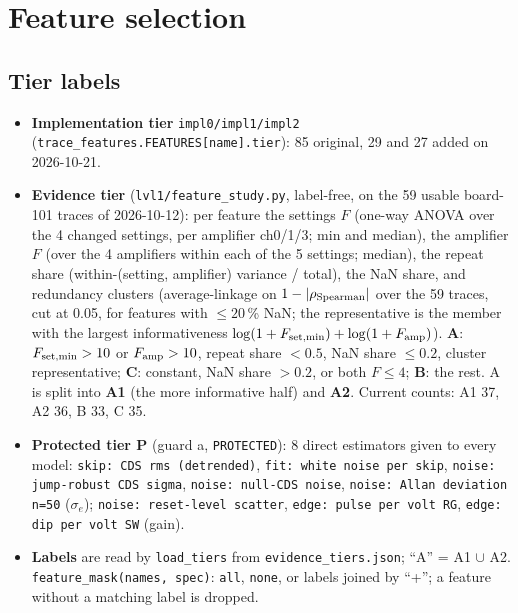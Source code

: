 \documentclass[10pt]{article}
\newcommand{\code}[1]{\texttt{#1}}
\newcommand{\se}{\sigma_e}
\begin{document}
\section{Feature selection}
\label{sec:featsel}

\subsection{Tier labels}

\begin{itemize}
  \item \textbf{Implementation tier} \code{impl0/impl1/impl2} (\code{trace\_features.FEATURES[name].tier}): 85 original,
        29 and 27 added on 2026-10-21.
  \item \textbf{Evidence tier} (\code{lvl1/feature\_study.py}, label-free, on the 59 usable board-101 traces of
        2026-10-12): per feature the settings $F$ (one-way ANOVA over the 4 changed settings, per amplifier ch0/1/3; min
        and median), the amplifier $F$ (over the 4 amplifiers within each of the 5 settings; median), the repeat share
        (within-(setting, amplifier) variance / total), the NaN share, and redundancy clusters (average-linkage on
        $1 - |\rho_{\rm Spearman}|$ over the 59 traces, cut at 0.05, for features with $\le 20$\,\% NaN; the
        representative is the member with the largest informativeness $\log(1+F_{\rm set,min}) + \log(1+F_{\rm amp})$).
        \textbf{A}: $F_{\rm set,min} > 10$ or $F_{\rm amp} > 10$, repeat share $< 0.5$, NaN share $\le 0.2$, cluster
        representative; \textbf{C}: constant, NaN share $> 0.2$, or both $F \le 4$; \textbf{B}: the rest. A is split
        into \textbf{A1} (the more informative half) and \textbf{A2}. Current counts: A1 37, A2 36, B 33, C 35.
  \item \textbf{Protected tier P} (guard a, \code{PROTECTED}): 8 direct estimators given to every model: \code{skip: CDS rms
        (detrended)}, \code{fit: white noise per skip}, \code{noise: jump-robust CDS sigma}, \code{noise: null-CDS noise},
        \code{noise: Allan deviation n=50} ($\se$); \code{noise: reset-level scatter}, \code{edge: pulse per volt RG},
        \code{edge: dip per volt SW} (gain).
  \item \textbf{Labels} are read by \code{load\_tiers} from \code{evidence\_tiers.json}; ``A'' = A1 $\cup$ A2.
        \code{feature\_mask(names, spec)}: \code{all}, \code{none}, or labels joined by ``+''; a feature without a
        matching label is dropped.
\end{itemize}
\end{document}

